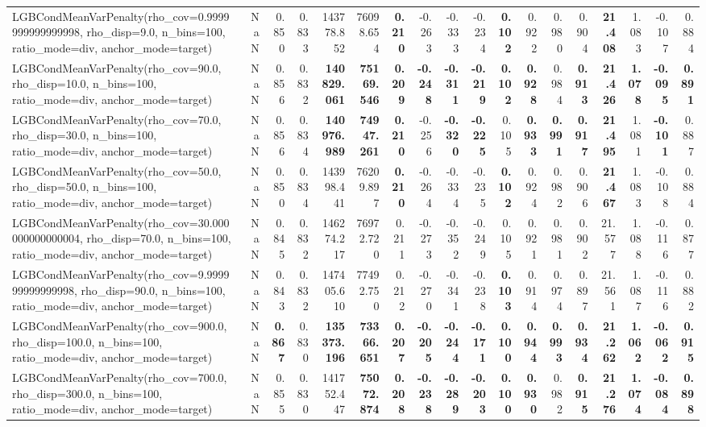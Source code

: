 \documentclass[11pt]{article}
\theoremstyle{plain}
\theoremstyle{definition}
\newcommand{\1}{\mathbf{1}}
\begin{document}
\begin{table}[htbp]
{\begin{tabular}{lrrrrrrrrrrrrrrrrr}
LGBCondMeanVarPenalty(rho\_cov=0.9999999999999998, rho\_disp=9.0, n\_bins=100, ratio\_mode=div, anchor\_mode=target) & NaN & 0.850 & 0.833 & 143778.852 & 76098.654 & \textbf{0.210} & -0.263 & -0.333 & -0.234 & \textbf{0.102} & 0.922 & 0.980 & 0.904 & \textbf{21.408} & 1.083 & -0.107 & 0.884 \\
LGBCondMeanVarPenalty(rho\_cov=90.0, rho\_disp=10.0, n\_bins=100, ratio\_mode=div, anchor\_mode=target) & NaN & 0.856 & 0.832 & \textbf{140829.061} & \textbf{75169.546} & \textbf{0.209} & \textbf{-0.248} & \textbf{-0.311} & \textbf{-0.219} & \textbf{0.102} & \textbf{0.928} & 0.984 & \textbf{0.913} & \textbf{21.426} & \textbf{1.078} & \textbf{-0.095} & \textbf{0.891} \\
LGBCondMeanVarPenalty(rho\_cov=70.0, rho\_disp=30.0, n\_bins=100, ratio\_mode=div, anchor\_mode=target) & NaN & 0.856 & 0.834 & \textbf{140976.989} & \textbf{74947.261} & \textbf{0.210} & -0.256 & \textbf{-0.320} & \textbf{-0.225} & 0.105 & \textbf{0.933} & \textbf{0.991} & \textbf{0.917} & \textbf{21.495} & 1.081 & \textbf{-0.101} & 0.887 \\
LGBCondMeanVarPenalty(rho\_cov=50.0, rho\_disp=50.0, n\_bins=100, ratio\_mode=div, anchor\_mode=target) & NaN & 0.850 & 0.834 & 143998.441 & 76209.897 & \textbf{0.210} & -0.264 & -0.334 & -0.235 & \textbf{0.102} & 0.924 & 0.982 & 0.906 & \textbf{21.467} & 1.083 & -0.108 & 0.884 \\
LGBCondMeanVarPenalty(rho\_cov=30.000000000000004, rho\_disp=70.0, n\_bins=100, ratio\_mode=div, anchor\_mode=target) & NaN & 0.845 & 0.832 & 146274.217 & 76972.720 & 0.211 & -0.273 & -0.352 & -0.249 & 0.105 & 0.921 & 0.981 & 0.902 & 21.577 & 1.088 & -0.116 & 0.877 \\
LGBCondMeanVarPenalty(rho\_cov=9.999999999999998, rho\_disp=90.0, n\_bins=100, ratio\_mode=div, anchor\_mode=target) & NaN & 0.843 & 0.832 & 147405.610 & 77492.750 & 0.212 & -0.270 & -0.341 & -0.238 & \textbf{0.103} & 0.914 & 0.974 & 0.897 & 21.561 & 1.087 & -0.116 & 0.882 \\
LGBCondMeanVarPenalty(rho\_cov=900.0, rho\_disp=100.0, n\_bins=100, ratio\_mode=div, anchor\_mode=target) & NaN & \textbf{0.867} & 0.830 & \textbf{135373.196} & \textbf{73366.651} & \textbf{0.207} & \textbf{-0.205} & \textbf{-0.244} & \textbf{-0.171} & \textbf{0.100} & \textbf{0.944} & \textbf{0.993} & \textbf{0.934} & \textbf{21.262} & \textbf{1.062} & \textbf{-0.062} & \textbf{0.915} \\
LGBCondMeanVarPenalty(rho\_cov=700.0, rho\_disp=300.0, n\_bins=100, ratio\_mode=div, anchor\_mode=target) & NaN & 0.855 & 0.830 & 141752.447 & \textbf{75072.874} & \textbf{0.208} & \textbf{-0.238} & \textbf{-0.289} & \textbf{-0.203} & \textbf{0.100} & \textbf{0.930} & 0.982 & \textbf{0.915} & \textbf{21.276} & \textbf{1.074} & \textbf{-0.084} & \textbf{0.898} \\

\end{tabular}}
\end{table}
\end{document}
